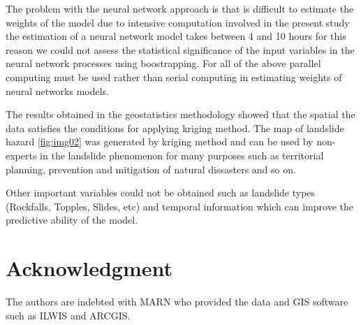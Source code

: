 \documentclass[11pt,twoside]{rmta2010esp}%
\begin{document}
The problem with the neural network approach is that is difficult to estimate the weights of the model due to intensive computation involved in the present study the estimation of a neural network model takes between 4 and 10 hours for this reason we could not assess the statistical significance of the input variables in the neural network processes using boostrapping. For all of the above parallel computing must be used rather than serial computing in estimating weights of neural networks models.



The results obtained in the geostatistics methodology showed that the spatial the data satisfies the conditions for applying kriging method. The map of landslide hazard \ref{fig:img02} was generated by kriging method and can be used by non-experts in the landslide phenomenon for many purposes such as territorial planning, prevention and mitigation of natural dissasters and so on. 

Other important variables could not be obtained such as landslide types (Rockfalls, Topples, Slides, etc) and temporal information which can improve the predictive ability of the model. 


\section{Acknowledgment}   
The authors are indebted with MARN who provided the data and GIS software such as ILWIS and ARCGIS.
\end{document}
